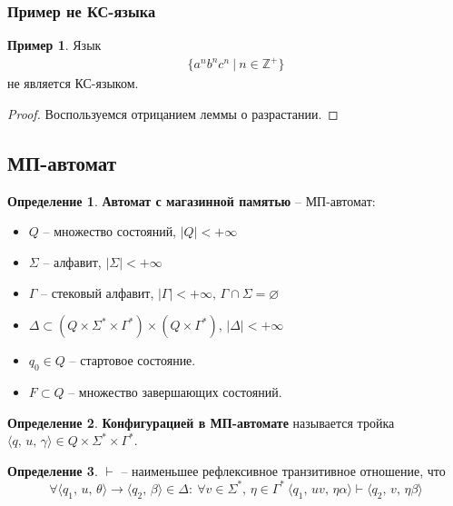 \documentclass[a4paper,12pt]{article}
\renewcommand{\emptyset}{\ensuremath{\varnothing}}
\theoremstyle{plain}
\theoremstyle{definition}
\newtheorem{definition}{Определение}[subsection]
\newtheorem*{example}{Пример}
\theoremstyle{remark}
\begin{document}
\subsubsection*{Пример не КС-языка}
\begin{example}
	Язык
	\begin{align*}
		\{a^nb^nc^n \:|\: n \in \mathbb{Z}^+\}
	\end{align*}
	не является КС-языком.
\end{example}

\begin{proof}
	Воспользуемся отрицанием леммы о разрастании.
\end{proof}

\subsection{МП-автомат}
\begin{definition}
	\textbf{Автомат с магазинной памятью} -- МП-автомат:
	\begin{itemize}
		\item $Q$ -- множество состояний, $\vert Q\vert < +\infty$
		\item $\Sigma$ -- алфавит, $\vert \Sigma\vert < +\infty$
		\item $\Gamma$ -- стековый алфавит, $\vert \Gamma\vert < +\infty,\, \Gamma \cap \Sigma = \emptyset$
		\item $\Delta \subset (Q \times \Sigma^* \times \Gamma^*) \times (Q \times \Gamma^*),\, \vert \Delta\vert < +\infty$
		\item $q_0 \in Q$ -- стартовое состояние.
		\item $F \subset Q$ -- множество завершающих состояний.
	\end{itemize}
\end{definition}

\begin{definition}
	\textbf{Конфигурацией в МП-автомате} называется тройка $\langle q,\, u,\, \gamma\rangle \in Q \times \Sigma^* \times \Gamma^*$.
\end{definition}

\begin{definition}
	$\vdash$ -- наименьшее рефлексивное транзитивное отношение, что
	\[
		\forall\langle q_1,\,u,\,\theta\rangle \to \langle q_2,\, \beta\rangle \in \Delta :\: \forall v \in \Sigma^*,\, \eta \in \Gamma^* \: \langle q_1,\, uv,\, \eta\alpha\rangle \vdash \langle q_2,\, v,\, \eta\beta\rangle
	\]
\end{definition}
\end{document}
